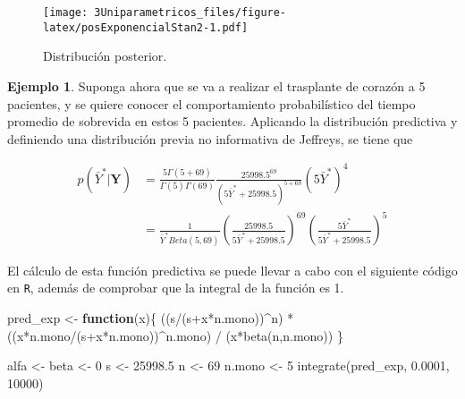 \documentclass[
  10pt,
  spanish,
]{book}
\newenvironment{Shaded}{\begin{snugshade}}{\end{snugshade}}
\newcommand{\ControlFlowTok}[1]{\textcolor[rgb]{0.13,0.29,0.53}{\textbf{#1}}}
\newcommand{\DecValTok}[1]{\textcolor[rgb]{0.00,0.00,0.81}{#1}}
\newcommand{\FloatTok}[1]{\textcolor[rgb]{0.00,0.00,0.81}{#1}}
\newcommand{\FunctionTok}[1]{\textcolor[rgb]{0.00,0.00,0.00}{#1}}
\newcommand{\NormalTok}[1]{#1}
\newcommand{\OtherTok}[1]{\textcolor[rgb]{0.56,0.35,0.01}{#1}}
\newcommand{\SpecialCharTok}[1]{\textcolor[rgb]{0.00,0.00,0.00}{#1}}
\theoremstyle{definition}
\theoremstyle{definition}
\newtheorem{example}{Ejemplo}[chapter]
\theoremstyle{definition}
\theoremstyle{definition}
\theoremstyle{remark}
\begin{document}
\begin{figure}
\centering
\texttt{[image: 3Uniparametricos\_files/figure-latex/posExponencialStan2-1.pdf]}
\caption{\label{fig:posExponencialStan2}Distribución posterior.}
\end{figure}

\begin{example}
\protect\hypertarget{exm:unnamed-chunk-65}{}{\label{exm:unnamed-chunk-65} }Suponga ahora que se va a realizar el trasplante de corazón a 5 pacientes, y se quiere conocer el comportamiento probabilístico del tiempo promedio de sobrevida en estos 5 pacientes. Aplicando la distribución predictiva y definiendo una distribución previa no informativa de Jeffreys, se tiene que

\begin{align*}
p(\bar{Y}^*|\mathbf{Y})&=\frac{5\Gamma(5+69)}{\Gamma(5)\Gamma(69)}\frac{25998.5^{69}}{(5\bar{Y}^*+25998.5)^{5+69}}(5\bar{Y}^*)^4\\
&=\frac{1}{\bar{Y}^*Beta(5,69)}\left(\frac{25998.5}{5\bar{Y}^*+25998.5}\right)^{69}\left(\frac{5\bar{Y}^*}{5\bar{Y}^*+25998.5}\right)^5
\end{align*}

El cálculo de esta función predictiva se puede llevar a cabo con el siguiente código en \texttt{R}, además de comprobar que la integral de la función es 1.
\end{example}

\begin{Shaded}
\begin{Highlighting}[]
\NormalTok{pred\_exp }\OtherTok{\textless{}{-}} \ControlFlowTok{function}\NormalTok{(x)\{}
\NormalTok{  ((s}\SpecialCharTok{/}\NormalTok{(s}\SpecialCharTok{+}\NormalTok{x}\SpecialCharTok{*}\NormalTok{n.mono))}\SpecialCharTok{\^{}}\NormalTok{n) }\SpecialCharTok{*} 
\NormalTok{    ((x}\SpecialCharTok{*}\NormalTok{n.mono}\SpecialCharTok{/}\NormalTok{(s}\SpecialCharTok{+}\NormalTok{x}\SpecialCharTok{*}\NormalTok{n.mono))}\SpecialCharTok{\^{}}\NormalTok{n.mono) }\SpecialCharTok{/} 
\NormalTok{    (x}\SpecialCharTok{*}\FunctionTok{beta}\NormalTok{(n,n.mono))}
\NormalTok{\}}


\NormalTok{alfa }\OtherTok{\textless{}{-}}\NormalTok{ beta }\OtherTok{\textless{}{-}} \DecValTok{0}
\NormalTok{s }\OtherTok{\textless{}{-}} \FloatTok{25998.5}
\NormalTok{n }\OtherTok{\textless{}{-}} \DecValTok{69}
\NormalTok{n.mono }\OtherTok{\textless{}{-}} \DecValTok{5}
\FunctionTok{integrate}\NormalTok{(pred\_exp, }\FloatTok{0.0001}\NormalTok{, }\DecValTok{10000}\NormalTok{)}
\end{Highlighting}
\end{Shaded}
\end{document}
